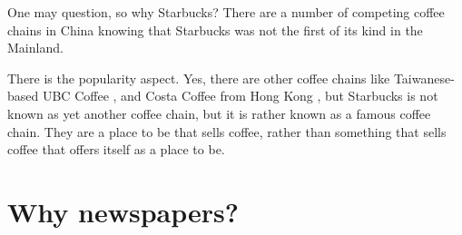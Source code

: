 One may question, so why Starbucks? There are a number of competing coffee
chains in China knowing that Starbucks was not the first of its kind in the
Mainland.

There is the popularity aspect. Yes, there are other coffee chains like
Taiwanese-based UBC
Coffee \autocite{CITEME}, and Costa Coffee from Hong Kong \autocite{CITEME}, but
Starbucks is not known as yet another coffee chain, but it is rather known as a
famous coffee chain. They are a place to be that sells coffee, rather than
something that sells coffee that offers itself as a place to be.

\section{Why newspapers?}\label{sec:why-papers}


